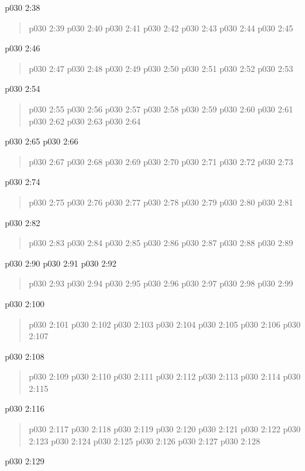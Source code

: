 \vs p030 2:38 
\begin{quote}
\vs p030 2:39 
\vs p030 2:40 
\vs p030 2:41 
\vs p030 2:42 
\vs p030 2:43 
\vs p030 2:44 
\vs p030 2:45 
\end{quote}
\vsetspace
\vs p030 2:46 
\begin{quote}
\vs p030 2:47 
\vs p030 2:48 
\vs p030 2:49 
\vs p030 2:50 
\vs p030 2:51 
\vs p030 2:52 
\vs p030 2:53 
\end{quote}
\vsetspace
\vs p030 2:54 
\begin{quote}
\vs p030 2:55 
\vs p030 2:56 
\vs p030 2:57 
\vs p030 2:58 
\vs p030 2:59 
\vs p030 2:60 
\vs p030 2:61 
\vs p030 2:62 
\vs p030 2:63 
\vs p030 2:64 
\end{quote}
\vsetspace
\vs p030 2:65 
\vsetspace
\vs p030 2:66 
\begin{quote}
\vs p030 2:67 
\vs p030 2:68 
\vs p030 2:69 
\vs p030 2:70 
\vs p030 2:71 
\vs p030 2:72 
\vs p030 2:73 
\end{quote}
\vsetspace
\vs p030 2:74 
\begin{quote}
\vs p030 2:75 
\vs p030 2:76 
\vs p030 2:77 
\vs p030 2:78 
\vs p030 2:79 
\vs p030 2:80 
\vs p030 2:81 
\end{quote}
\vsetspace
\vs p030 2:82 
\begin{quote}
\vs p030 2:83 
\vs p030 2:84 
\vs p030 2:85 
\vs p030 2:86 
\vs p030 2:87 
\vs p030 2:88 
\vs p030 2:89 
\end{quote}
\vsetspace
\vs p030 2:90 
\vsetspace
\vs p030 2:91 
\vsetspace
\vs p030 2:92 
\begin{quote}
\vs p030 2:93 
\vs p030 2:94 
\vs p030 2:95 
\vs p030 2:96 
\vs p030 2:97 
\vs p030 2:98 
\vs p030 2:99 
\end{quote}
\vsetspace
\vs p030 2:100 
\begin{quote}
\vs p030 2:101 
\vs p030 2:102 
\vs p030 2:103 
\vs p030 2:104 
\vs p030 2:105 
\vs p030 2:106 
\vs p030 2:107 
\end{quote}
\vsetspace
\vs p030 2:108 
\begin{quote}
\vs p030 2:109 
\vs p030 2:110 
\vs p030 2:111 
\vs p030 2:112 
\vs p030 2:113 
\vs p030 2:114 
\vs p030 2:115 
\end{quote}
\vsetspace
\vs p030 2:116 
\begin{quote}
\vs p030 2:117 
\vs p030 2:118 
\vs p030 2:119 
\vs p030 2:120 
\vs p030 2:121 
\vs p030 2:122 
\vs p030 2:123 
\vs p030 2:124 
\vs p030 2:125 
\vs p030 2:126 
\vs p030 2:127 
\vs p030 2:128 
\end{quote}
\vs p030 2:129 \pc 
